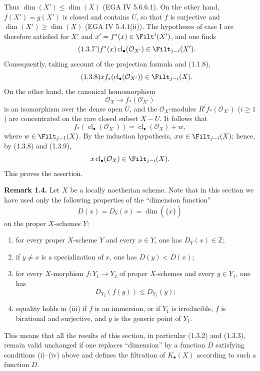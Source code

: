 \documentclass[11pt]{article}
\newcommand{\cl}{\operatorname{cl}}
\begin{document}
Thus $\dim(X')\leq\dim(X)$ (EGA IV 5.6.6.1). On the other hand, $f(X')=g(X')$ is closed and contains $U$, so that $f$ is surjective and $\dim(X')\geq\dim(X)$ (EGA IV 5.4.1(ii)). The hypotheses of case I are therefore satisfied for $X'$ and $x'=f^*(x)\in\Filt^i(X')$, and one finds
\begin{equation}\tag{1.3.7'}
 f^*(x)\cl_\bullet(\mathcal O_{X'})\in\Filt_{j-i}(X').
\end{equation}
Consequently, taking account of the projection formula and (1.1.8),
\begin{equation}\tag{1.3.8}
 x f_*(\cl_\bullet(\mathcal O_{X'}))\in\Filt_{j-i}(X).
\end{equation}
On the other hand, the canonical homomorphism
\[
 \mathcal O_X\longrightarrow f_*(\mathcal O_{X'})
\]
is an isomorphism over the dense open $U$, and the $\mathcal O_X$-modules $R^if_*(\mathcal O_{X'})$ ($i\geq1$) are concentrated on the rare closed subset $X-U$. It follows that
\begin{equation}\tag{1.3.9}
 f_*(\cl_\bullet(\mathcal O_{X'}))=\cl_\bullet(\mathcal O_X)+w,
\end{equation}
where $w\in\Filt_{j-1}(X)$. By the induction hypothesis, $xw\in\Filt_{j-i}(X)$; hence, by (1.3.8) and (1.3.9),
\[
 x\cl_\bullet(\mathcal O_X)\in\Filt_{j-i}(X).
\]
This proves the assertion.

\textbf{Remark 1.4.} Let $X$ be a locally noetherian scheme. Note that in this section we have used only the following properties of the ``dimension function''
\[
 D(x)=D_Y(x)=\dim(\overline{\{x\}})
\]
on the proper $X$-schemes $Y$:
\begin{enumerate}[label=(\roman*)]
\item for every proper $X$-scheme $Y$ and every $x\in Y$, one has $D_Y(x)\in\mathbb Z$;
\item if $y\ne x$ is a specialization of $x$, one has $D(y)<D(x)$;
\item for every $X$-morphism $f:Y_1\to Y_2$ of proper $X$-schemes and every $y\in Y_1$, one has
\[
 D_{Y_2}(f(y))\leq D_{Y_1}(y);
\]
\item equality holds in (iii) if $f$ is an immersion, or if $Y_1$ is irreducible, $f$ is birational and surjective, and $y$ is the generic point of $Y_1$.
\end{enumerate}
This means that all the results of this section, in particular (1.3.2) and (1.3.3), remain valid unchanged if one replaces ``dimension'' by a function $D$ satisfying conditions (i)--(iv) above and defines the filtration of $K_\bullet(X)$ according to such a function $D$.
\end{document}
